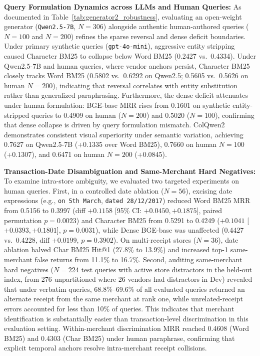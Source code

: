 \textbf{Query Formulation Dynamics across LLMs and Human Queries:} As documented in Table~\ref{tab:generator2_robustness}, evaluating an open-weight generator (\texttt{Qwen2.5-7B}, $N=306$) alongside authentic human-authored queries ($N=100$ and $N=200$) refines the sparse reversal and dense deficit boundaries. Under primary synthetic queries (\texttt{gpt-4o-mini}), aggressive entity stripping caused Character BM25 to collapse below Word BM25 (0.2427 vs.\ 0.4334). Under Qwen2.5-7B and human queries, where vendor anchors persist, Character BM25 closely tracks Word BM25 (0.5802 vs.\ 0.6292 on Qwen2.5; 0.5605 vs.\ 0.5626 on human $N=200$), indicating that reversal correlates with entity substitution rather than generalized paraphrasing. Furthermore, the dense deficit attenuates under human formulation: BGE-base MRR rises from 0.1601 on synthetic entity-stripped queries to 0.4909 on human ($N=200$) and 0.5020 ($N=100$), confirming that dense collapse is driven by query formulation mismatch. ColQwen2 demonstrates consistent visual superiority under semantic variation, achieving 0.7627 on Qwen2.5-7B (+0.1335 over Word BM25), 0.7660 on human $N=100$ (+0.1307), and 0.6471 on human $N=200$ (+0.0845).

\textbf{Transaction-Date Disambiguation and Same-Merchant Hard Negatives:} To examine intra-store ambiguity, we evaluated two targeted experiments on human queries. First, in a controlled date ablation ($N=56$), excising date expressions (e.g., \texttt{on 5th March}, \texttt{dated 28/12/2017}) reduced Word BM25 MRR from 0.5156 to 0.3997 (diff $+0.1158$ [95\% CI: $+0.0450, +0.1875$], paired permutation $p=0.0023$) and Character BM25 from 0.5291 to 0.4249 ($+0.1041$ [$+0.0393, +0.1801$], $p=0.0031$), while Dense BGE-base was unaffected (0.4427 vs.\ 0.4228, diff $+0.0199$, $p=0.3902$). On multi-receipt stores ($N=36$), date ablation halved Char BM25 Hit@1 (27.8\% to 13.9\%) and increased top-1 same-merchant false returns from 11.1\% to 16.7\%. Second, auditing same-merchant hard negatives ($N=224$ test queries with active store distractors in the held-out index, from 276 unpartitioned where 26 vendors had distractors in Dev) revealed that under verbatim queries, 68.8\%--69.6\% of all evaluated queries returned an alternate receipt from the same merchant at rank one, while unrelated-receipt errors accounted for less than 10\% of queries. This indicates that merchant identification is substantially easier than transaction-level discrimination in this evaluation setting. Within-merchant discrimination MRR reached 0.4608 (Word BM25) and 0.4303 (Char BM25) under human paraphrase, confirming that explicit temporal anchors resolve intra-merchant receipt collisions.

